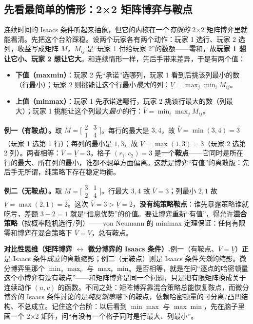 \subsection{先看最简单的情形：2×2 矩阵博弈与鞍点}
\label{sec:dg-matrix}
连续时间的 Isaacs 条件听起来抽象，但它的内核在一个\emph{有限的} 2×2 矩阵博弈里就能看清。先把这个台阶踩稳。设两个玩家各有两个动作：玩家 1 选行、玩家 2 选列，收益写成矩阵 $M$，$M_{ij}$ 是“玩家 1 付给玩家 2”的数额——零和，故\textbf{玩家 1 想让它小、玩家 2 想让它大}。和连续情形一样，先后手带来差异，于是有两个值：

\begin{itemize}
  \item \textbf{下值（maxmin）}：玩家 2 先“承诺”选哪列，玩家 1 看到后挑该列最小的数（行最小）；玩家 2 则挑能让这个行最小\emph{最大}的列：$\underline V=\max_j\min_i M_{ij}$。
  \item \textbf{上值（minmax）}：玩家 1 先承诺选哪行，玩家 2 挑该行最大的数（列最大）；玩家 1 挑能让这个列最大\emph{最小}的行：$\overline V=\min_i\max_j M_{ij}$。
\end{itemize}

\begin{example}
\label{ex:dg-saddle}
\textbf{例一（有鞍点）。}\;取 $M=\big[\begin{smallmatrix}2&3\\1&4\end{smallmatrix}\big]$。每行的最大是 $3,4$，故 $\overline V=\min(3,4)=3$（玩家 1 选第 1 行）；每列的最小是 $1,3$，故 $\underline V=\max(1,3)=3$（玩家 2 选第 2 列）。两者相等：$\overline V=\underline V=3$。格子 $(r_1,c_2)=3$ 是一个\textbf{鞍点}——它同时是所在行的最大、所在列的最小，谁都不想单方面偏离。这就是博弈“有值”的离散版：先后手无所谓，纯策略下存在稳定均衡。

\textbf{例二（无鞍点）。}\;取 $M=\big[\begin{smallmatrix}3&1\\2&4\end{smallmatrix}\big]$。行最大 $3,4$ 故 $\overline V=3$；列最小 $2,1$ 故 $\underline V=\max(2,1)=2$。这次 $\overline V=3>\underline V=2$，\textbf{没有纯策略鞍点}：谁先暴露策略谁就吃亏，差额 $3-2=1$ 就是“信息优势”的价值。要让博弈重新“有值”，得允许\textbf{混合策略}（按概率随机选行/列）——von Neumann 的 minimax 定理保证：任何有限零和博弈在混合策略下 $\overline V=\underline V$，总有鞍点。
\end{example}

\begin{note}
\textbf{对比性思维（矩阵博弈 $\leftrightarrow$ 微分博弈的 Isaacs 条件）.}\;例一（有鞍点、$\overline V=\underline V$）正是 Isaacs 条件\emph{成立}的离散缩影；例二（无鞍点）则是 Isaacs 条件\emph{失效}的缩影。微分博弈里那个 $\min_u\max_v$ 与 $\max_v\min_u$ 是否相等，就是在问“逐点的哈密顿量这个小博弈有没有鞍点”——和矩阵博弈是同一个问题，只是把有限矩阵换成关于连续动作 $(u,v)$ 的函数。不同之处：矩阵博弈靠混合策略总能恢复鞍点，而微分博弈的 Isaacs 条件讨论的是\emph{纯反馈策略}下的鞍点，依赖哈密顿量的可分离/凸凹结构、不总成立。记住这个台阶：以后看到 $\min\max$ 与 $\max\min$，先在脑子里画一个 2×2 矩阵，问“有没有一个格子同时是行最大、列最小”。
\end{note}

